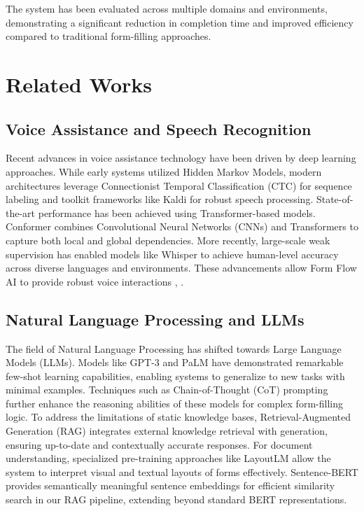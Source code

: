 \documentclass[conference]{IEEEtran}
\begin{document}
The system has been evaluated across multiple domains and environments, demonstrating a significant reduction in completion time and improved efficiency compared to traditional form-filling approaches.

\section{Related Works}

\subsection{Voice Assistance and Speech Recognition}

Recent advances in voice assistance technology have been driven by deep learning approaches. While early systems utilized Hidden Markov Models, modern architectures leverage Connectionist Temporal Classification (CTC) for sequence labeling \cite{b14} and toolkit frameworks like Kaldi \cite{b13} for robust speech processing. 
State-of-the-art performance has been achieved using Transformer-based models. Conformer \cite{b12} combines Convolutional Neural Networks (CNNs) and Transformers to capture both local and global dependencies. More recently, large-scale weak supervision has enabled models like Whisper \cite{b11} to achieve human-level accuracy across diverse languages and environments. These advancements allow Form Flow AI to provide robust voice interactions \cite{b2}, \cite{b5}.

\subsection{Natural Language Processing and LLMs}

The field of Natural Language Processing has shifted towards Large Language Models (LLMs). Models like GPT-3 \cite{b10} and PaLM \cite{b17} have demonstrated remarkable few-shot learning capabilities, enabling systems to generalize to new tasks with minimal examples. Techniques such as Chain-of-Thought (CoT) prompting \cite{b18} further enhance the reasoning abilities of these models for complex form-filling logic.
To address the limitations of static knowledge bases, Retrieval-Augmented Generation (RAG) \cite{b9} integrates external knowledge retrieval with generation, ensuring up-to-date and contextually accurate responses. For document understanding, specialized pre-training approaches like LayoutLM \cite{b20} allow the system to interpret visual and textual layouts of forms effectively. Sentence-BERT \cite{b19} provides semantically meaningful sentence embeddings for efficient similarity search in our RAG pipeline, extending beyond standard BERT \cite{b4} representations.
\end{document}
